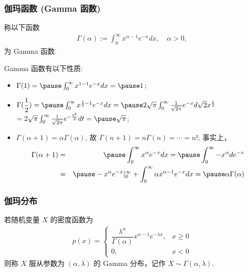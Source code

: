 \documentclass[Prob-All.tex]{subfiles}
\begin{document}
\begin{frame}
	\frametitle{伽玛函数 (Gamma 函数)}
	\begin{defi}
		称以下函数
		\begin{eqnarray*}
			\Gamma(\alpha):=\int_0^\infty x^{\alpha-1}e^{-x}dx, \quad \alpha>0,
		\end{eqnarray*}
		为 Gamma 函数.
	\end{defi}
	\pause
	Gamma 函数有以下性质:\pause
	\begin{itemize}[<+-|alert@+>]
		\item $\Gamma(1)=\pause \int_0^\infty x^{1-1}e^{-x}dx=\pause 1$;
		\item $\Gamma(\dfrac{1}{2})=\pause \int_0^\infty x^{\frac{1}{2}-1}e^{-x}dx=\pause 2\sqrt{\pi}\int_0^\infty \frac{1}{\sqrt{2\pi}}e^{-x}d\sqrt{2}x^{\frac{1}{2}}$ \pause $=2\sqrt{\pi}\int_0^\infty \frac{1}{\sqrt{2\pi}}e^{-\frac{t^2}{2}}dt=\pause \sqrt{\pi}$;
		\item $\Gamma (\alpha+1)=\alpha\Gamma (\alpha)$, 故 $\Gamma (n+1)=n\Gamma (n)=\cdots =n!$; \pause 事实上，
		      \begin{eqnarray*}
			      \Gamma(\alpha+1)&=&\pause \int_0^\infty x^\alpha e^{-x}dx=\pause \int_0^\infty -x^\alpha de^{-x}\\
			      &=&\pause -x^\alpha e^{-x}|_0^\infty+\int_0^\infty \alpha x^{\alpha-1} e^{-x}dx=\pause \alpha\Gamma(\alpha)
		      \end{eqnarray*}
	\end{itemize}

\end{frame}
\begin{frame}
	\frametitle{伽玛分布}
	\begin{defi}[Gamma 分布]
		若随机变量 $X$ 的密度函数为
		\begin{eqnarray*}
			p(x)=\left\{
			\begin{array}{ll}
				\dfrac{\lambda^\alpha}{\Gamma(\alpha)}x^{\alpha-1}e^{-\lambda x}, & x\ge 0 \\
				0,                                                                & x<0
			\end{array}
			\right.
		\end{eqnarray*}
		则称 $X$ 服从参数为 $(\alpha,\lambda)$ 的 Gamma 分布，记作 $X\sim \Gamma (\alpha,\lambda)$.
	\end{defi}
\end{frame}
\end{document}

